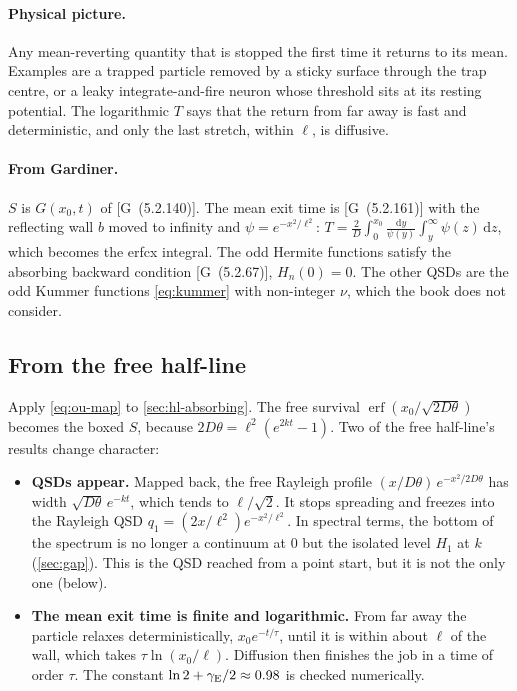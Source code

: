 \documentclass[11pt]{article}
\numberwithin{equation}{section}
\newcommand{\dd}{\mathrm{d}}
\newcommand{\G}[1]{[G~(#1)]}
\begin{document}
\paragraph{Physical picture.} Any mean-reverting quantity that is stopped the first time it returns to its
mean. Examples are a trapped particle removed by a sticky surface through the trap centre, or a leaky
integrate-and-fire neuron whose threshold sits at its resting potential. The logarithmic $T$ says that the return
from far away is fast and deterministic, and only the last stretch, within $\ell$, is diffusive.

\paragraph{From Gardiner.} $S$ is $G(x_0,t)$ of \G{5.2.140}. The mean exit time is \G{5.2.161} with the
reflecting wall $b$ moved to infinity and $\psi=e^{-x^2/\ell^2}$:
$T=\frac2D\int_0^{x_0}\frac{\dd y}{\psi(y)}\int_y^\infty\psi(z)\,\dd z$, which becomes the erfcx integral. The
odd Hermite functions satisfy the absorbing backward condition \G{5.2.67}, $H_n(0)=0$. The other QSDs are the
odd Kummer functions \cref{eq:kummer} with non-integer $\nu$, which the book does not consider.

\subsection{From the free half-line}

Apply \cref{eq:ou-map} to \cref{sec:hl-absorbing}. The free survival $\operatorname{erf}(x_0/\sqrt{2D\theta})$
becomes the boxed $S$, because $2D\theta=\ell^2(e^{2kt}-1)$. Two of the free half-line's results change
character:
\begin{itemize}
  \item \textbf{QSDs appear.} Mapped back, the free Rayleigh profile $(x/D\theta)\,e^{-x^2/2D\theta}$ has
        width $\sqrt{D\theta}\,e^{-kt}$, which tends to $\ell/\sqrt2$. It stops spreading and freezes into the
        Rayleigh QSD $q_1=(2x/\ell^2)e^{-x^2/\ell^2}$. In spectral terms, the bottom of the spectrum is no longer
        a continuum at $0$ but the isolated level $H_1$ at $k$ (\cref{sec:gap}). This is the QSD reached from a
        point start, but it is not the only one (below).
  \item \textbf{The mean exit time is finite and logarithmic.} From far away the particle relaxes
        deterministically, $x_0e^{-t/\tau}$, until it is within about $\ell$ of the wall, which takes
        $\tau\ln(x_0/\ell)$. Diffusion then finishes the job in a time of order $\tau$. The constant
        $\ln2+\gamma_{\rm E}/2\approx0.98$ is checked numerically.
\end{itemize}
\end{document}
